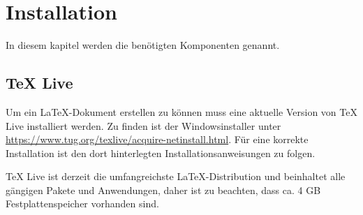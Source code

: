\documentclass[12pt,a4paper, listof=entryprefix, bibliography=totocnumbered,toc=listofnumbered,lof=listofnumbered]{scrartcl}
\newcounter{verzeichnis}
\begin{document}
\singlespacing %
\setcounter{section}{0}
\setcounter{page}{1}

\tableofcontents %
\pagebreak

\onehalfspacing %
\renewcommand{\thesection}{\arabic{section}} %
\setcounter{page}{1}	%
\setcounter{section}{0}
\renewcommand{\sectionmark}[1]{\markright{#1}} %
\renewcommand{\subsectionmark}[1]{}            %
\renewcommand{\subsubsectionmark}[1]{}         %
\rhead{\rightmark}                             %

\section{Installation}
\label{ch:instalaltion}
In diesem kapitel werden die benötigten Komponenten genannt.

\subsection{TeX Live}
\label{ch:texlive}
Um ein \LaTeX-Dokument erstellen zu können muss eine aktuelle Version von TeX Live installiert werden. Zu finden ist der Windowsinstaller unter \url{https://www.tug.org/texlive/acquire-netinstall.html}. Für eine korrekte Installation ist den dort hinterlegten Installationsanweisungen zu folgen.

TeX Live ist derzeit die umfangreichste \LaTeX-Distribution und beinhaltet alle gängigen Pakete und Anwendungen, daher ist zu beachten, dass ca. 4 GB Festplattenspeicher vorhanden sind.
\end{document}
